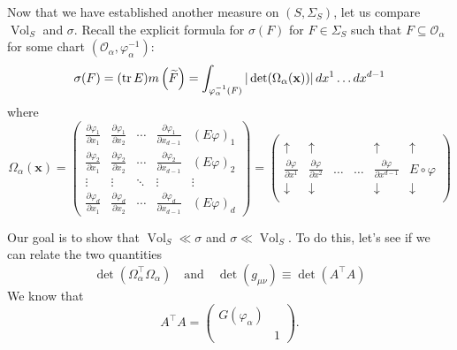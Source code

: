 \documentclass{article}
\theoremstyle{definition}
\renewcommand\det{\operatorname{det}}
\newcommand{\p}{\partial}
\newcommand{\al}{\alpha}
\newcommand{\f}[2]{\frac{#1}{#2}}
\theoremstyle{theorem}
\newcommand{\Vol}{\operatorname{Vol}}
\begin{document}
Now that we have established another measure on $(S,\Sigma_S)$, let us compare $\Vol_S$ and $\sigma$. Recall the explicit formula for $\sigma(F)$ for $F\in \Sigma_S$ such that $F\subseteq \mathcal{O}_\al$ for some chart $(\mathcal{O}_\al, \varphi^{-1}_\al)$:
\begin{equation*}
\sigma(F)=(\tr E)m\left(\widetilde{F}\right)=\int_{\varphi_\alpha^{-1}(F)}|\det(\Omega_\alpha(\mathbf{x}))|\,dx^1\dots dx^{d-1}
\end{equation*}
where
\begin{equation*}
\Omega_\alpha(\mathbf{x})=
\begin{pmatrix}
\frac{\partial \varphi_1}{\partial x_1} & \frac{\partial \varphi_1}{\partial x_2} & \cdots & \frac{\partial \varphi_1}{\partial x_{d-1}} & (E\varphi)_1\\
\frac{\partial \varphi_2}{\partial x_1} & \frac{\partial \varphi_2}{\partial x_2} & \cdots & \frac{\partial \varphi_2}{\partial x_{d-1}} & (E\varphi)_2\\
 \vdots & \vdots &\ddots & \vdots & \vdots \\
\frac{\partial \varphi_d}{\partial x_1} & \frac{\partial \varphi_d}{\partial x_2} & \cdots & \frac{\partial \varphi_d}{\partial x_{d-1}} & (E\varphi)_d
\end{pmatrix}
= 
\left(\begin{array}{ccccc|c}
     & & & & &\\
    \uparrow &\uparrow & & & \uparrow &\uparrow \\ 
    \f{\p \varphi}{\p x^1}& \f{\p \varphi}{\p x^2} & \dots &\dots&\f{\p \varphi}{\p x^{d-1}}& E \circ \varphi \\
    \downarrow  &\downarrow  & & & \downarrow  &\downarrow \\ 
    &&&& & 
    \end{array}\right)
\end{equation*}

Our goal is to show that $\Vol_S \ll \sigma$ and $\sigma \ll \Vol_S$. To do this, let's see if we can relate the two quantities
\begin{equation*}
    \det(\Omega_\al^\top \Omega_\al) \quad \text{and} \quad \det({g_{\mu\nu}}) \equiv \det({A^\top A})
\end{equation*}
We know that 
\begin{equation*}
    A^\top A = \begin{pmatrix*}
        G(\varphi_\al) & \\ & 1
    \end{pmatrix*}.
\end{equation*}
\end{document}
